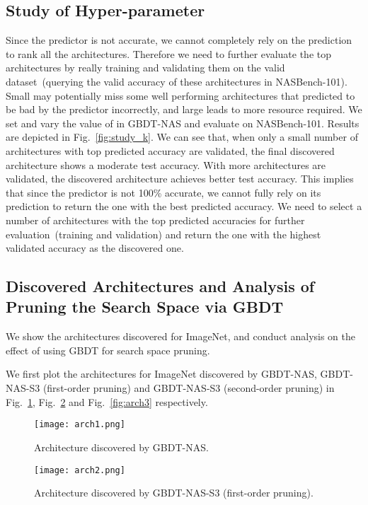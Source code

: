 \documentclass{article}
\begin{document}
\subsection{Study of Hyper-parameter }
Since the predictor is not  accurate, we cannot completely rely on the prediction to rank all the architectures. Therefore we need to further evaluate the top  architectures by really training and validating them on the valid dataset~(querying the valid accuracy of these architectures in NASBench-101). Small  may potentially miss some well performing architectures that predicted to be bad by the predictor incorrectly, and large  leads to more resource required. We set  and vary the value of  in GBDT-NAS and evaluate on NASBench-101. Results are depicted in Fig.~\ref{fig:study_k}. We can see that, when only a small number of architectures with top predicted accuracy are validated, the final discovered architecture shows a moderate test accuracy. With more architectures are validated, the discovered architecture achieves better test accuracy. This implies that since the predictor is not 100\% accurate, we cannot fully rely on its prediction to return the one with the best predicted accuracy. We need to select a number of architectures with the top predicted accuracies for further evaluation~(training and validation) and return the one with the highest validated accuracy as the discovered one.

\subsection{Discovered Architectures and Analysis of Pruning the Search Space via GBDT}
We show the architectures discovered for ImageNet, and conduct analysis on the effect of using GBDT for search space pruning.

We first plot the architectures for ImageNet discovered by GBDT-NAS, GBDT-NAS-S3 (first-order pruning) and GBDT-NAS-S3 (second-order pruning) in Fig.~\ref{fig:arch1}, Fig.~\ref{fig:arch2} and Fig.~\ref{fig:arch3} respectively.
\begin{figure}[htbp]
\centering
\texttt{[image: arch1.png]}
\caption{Architecture discovered by GBDT-NAS.}
\label{fig:arch1}
\end{figure}

\begin{figure}[htbp]
\centering
\texttt{[image: arch2.png]}
\caption{Architecture discovered by GBDT-NAS-S3 (first-order pruning).}
\label{fig:arch2}
\end{figure}
\end{document}
